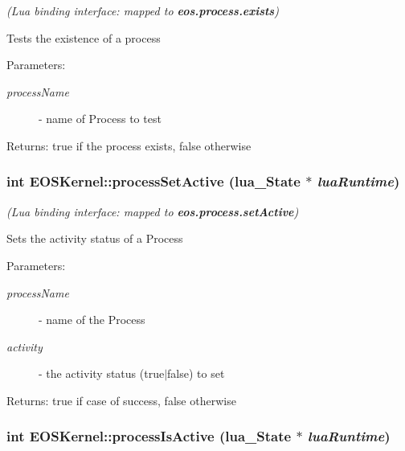 {\em (Lua binding interface: mapped to {\bf eos.process.exists})\/}\par
\par
 Tests the existence of a process 

\begin{Desc}
\item[Parameters:]
\begin{description}
\item[{\em processName}]- name of Process to test \end{description}
\end{Desc}
\begin{Desc}
\item[Returns:]true if the process exists, false otherwise \end{Desc}
\hypertarget{structEOSKernel_4def28b41973ca584e9a701dc77493bc}{
\subsubsection[{processSetActive}]{\setlength{\rightskip}{0pt plus 5cm}int EOSKernel::processSetActive (lua\_\-State $\ast$ {\em luaRuntime})}}
\label{structEOSKernel_4def28b41973ca584e9a701dc77493bc}


{\em (Lua binding interface: mapped to {\bf eos.process.setActive})\/}\par
\par
 Sets the activity status of a Process 

\begin{Desc}
\item[Parameters:]
\begin{description}
\item[{\em processName}]- name of the Process \item[{\em activity}]- the activity status (true$|$false) to set \end{description}
\end{Desc}
\begin{Desc}
\item[Returns:]true if case of success, false otherwise \end{Desc}
\hypertarget{structEOSKernel_0cc83428fafd6edbde079be3d40ab9b5}{
\subsubsection[{processIsActive}]{\setlength{\rightskip}{0pt plus 5cm}int EOSKernel::processIsActive (lua\_\-State $\ast$ {\em luaRuntime})}}
\label{structEOSKernel_0cc83428fafd6edbde079be3d40ab9b5}


